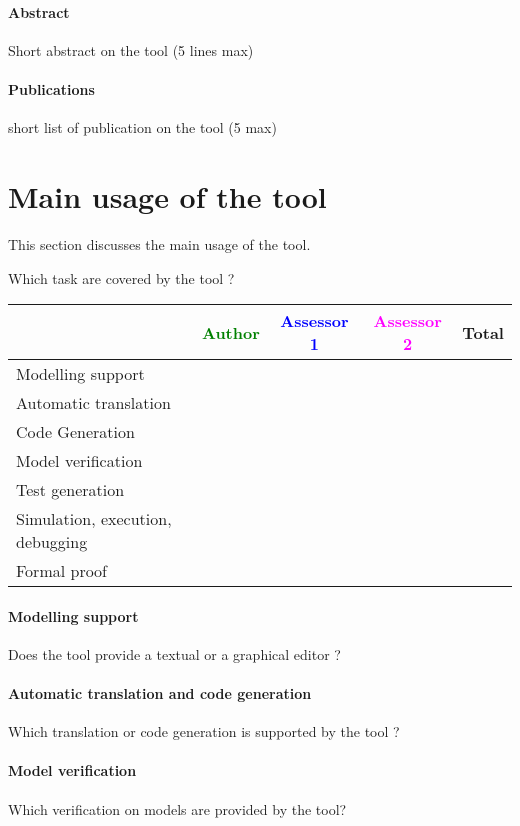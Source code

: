 \paragraph{Abstract} Short abstract on the tool (5 lines max)

\paragraph{Publications} short list of publication on the tool (5 max)


\section{Main usage of the tool}
\label{main_usage}

This section discusses the main usage of the tool.

Which task are covered by the tool ?


\begin{tabular}{|l | c | c | c | c|}
\hline
& \textcolor{green}{Author} & \textcolor{blue}{Assessor 1} & \textcolor{magenta}{Assessor 2} & Total \\
\hline 
Modelling support & & & &  \\
\hline
Automatic translation  & & & & \\
\hline
Code Generation  & & & & \\
\hline
Model verification & & & & \\
\hline
Test generation & & & & \\
\hline
Simulation, execution, debugging & & & & \\
\hline
Formal proof & & & & \\
\hline
\end{tabular}

\paragraph{Modelling support}
Does the tool provide a  textual or a graphical editor ?

\paragraph{Automatic translation and code generation}
Which translation or code generation is supported by the tool ?

\paragraph{Model verification}
Which verification on models are provided by the tool?

